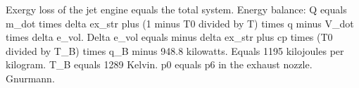Exergy loss of the jet engine equals the total system.  
Energy balance:  
Q equals m_dot times delta ex_str plus (1 minus T0 divided by T) times q minus V_dot times delta e_vol.  
Delta e_vol equals minus delta ex_str plus cp times (T0 divided by T_B) times q_B minus 948.8 kilowatts.  
Equals 1195 kilojoules per kilogram.  
T_B equals 1289 Kelvin.  
p0 equals p6 in the exhaust nozzle.  
Gnurmann.
